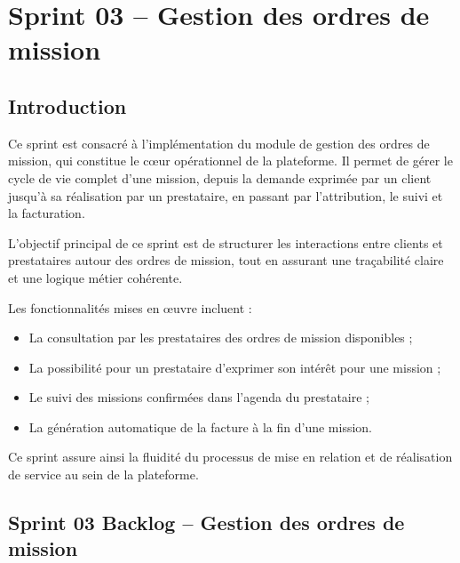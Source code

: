 \chapter{Sprint 03 – Gestion des ordres de mission}
\section*{Introduction}

Ce sprint est consacré à l’implémentation du module de gestion des ordres de mission, qui constitue le cœur opérationnel de la plateforme. Il permet de gérer le cycle de vie complet d’une mission, depuis la demande exprimée par un client jusqu’à sa réalisation par un prestataire, en passant par l’attribution, le suivi et la facturation.

L’objectif principal de ce sprint est de structurer les interactions entre clients et prestataires autour des ordres de mission, tout en assurant une traçabilité claire et une logique métier cohérente.

Les fonctionnalités mises en œuvre incluent :
\begin{itemize}
  \item La consultation par les prestataires des ordres de mission disponibles ;
  \item La possibilité pour un prestataire d’exprimer son intérêt pour une mission ;
  \item Le suivi des missions confirmées dans l’agenda du prestataire ;
  \item La génération automatique de la facture à la fin d’une mission.
\end{itemize}

Ce sprint assure ainsi la fluidité du processus de mise en relation et de réalisation de service au sein de la plateforme.


\section{Sprint 03 Backlog – Gestion des ordres de mission}


